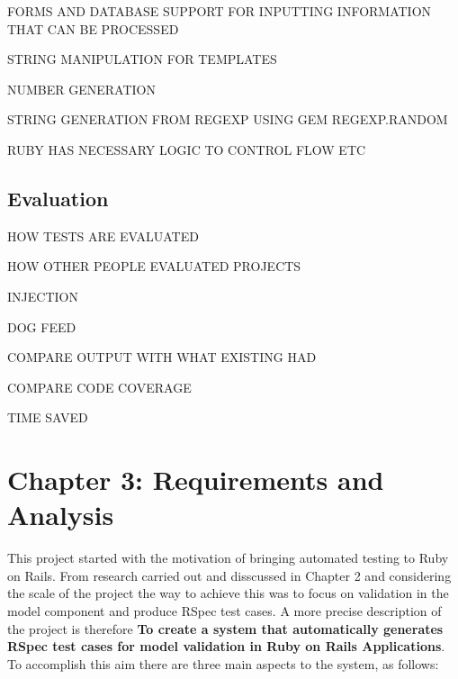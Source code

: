\documentclass[a4paper,12pt]{article}
\begin{document}
\vspace{5mm}
\par FORMS AND DATABASE SUPPORT FOR INPUTTING INFORMATION THAT CAN BE PROCESSED
\vspace{5mm}
\par STRING MANIPULATION FOR TEMPLATES
\vspace{5mm}
\par NUMBER GENERATION
\vspace{5mm}
\par STRING GENERATION FROM REGEXP USING GEM REGEXP.RANDOM
\vspace{5mm}
\par RUBY HAS NECESSARY LOGIC TO CONTROL FLOW ETC


\subsection{Evaluation}
\par HOW TESTS ARE EVALUATED
\par HOW OTHER PEOPLE EVALUATED PROJECTS
\par INJECTION
\par DOG FEED
\par COMPARE OUTPUT WITH WHAT EXISTING HAD
\par COMPARE CODE COVERAGE
\par TIME SAVED


\newpage
\section{Chapter 3: Requirements and Analysis}

\par This project started with the motivation of bringing automated testing to Ruby on Rails. From research carried out and disscussed in Chapter 2 and considering the scale of the project the way to achieve this was to focus on validation in the model component and produce RSpec test cases. A more precise description of the project is therefore \textbf{To create a system that automatically generates RSpec test cases for model validation in Ruby on Rails Applications}. To accomplish this aim there are three main aspects to the system, as follows:
\end{document}
